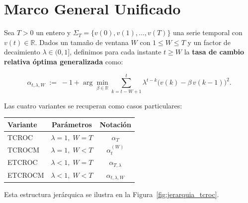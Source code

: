 \section{Marco General Unificado}
\label{sec:tcroc_marco_general}

Sea \(T > 0\) un entero y \(\Sigma_T = \{v(0), v(1), \dots, v(T)\}\) una serie temporal con \(v(t) \in \mathbb{R}\). Dados un tamaño de ventana \(W\) con \(1 \leq W \leq T\) y un factor de decaimiento \(\lambda \in (0, 1]\), definimos para cada instante \(t \geq W\) la \textbf{tasa de cambio relativa óptima generalizada} como:

\begin{equation}
    \alpha_{t,\lambda,W} \;:=\; -1 + \arg\min_{\beta \in \mathbb{R}} \sum_{k=t-W+1}^{t} \lambda^{t-k} \bigl(v(k) - \beta\, v(k-1)\bigr)^2.
\label{eq:tcroc_general}
\end{equation}

Las cuatro variantes se recuperan como casos particulares:

\begin{center}
\renewcommand{\arraystretch}{1.3}
\begin{tabular}{lcc}
\toprule
\textbf{Variante} & \textbf{Parámetros} & \textbf{Notación} \\
\midrule
TCROC   & \(\lambda = 1,\; W = T\) & \(\alpha_T\) \\
TCROCM  & \(\lambda = 1,\; W < T\) & \(\alpha_{t}^{(W)}\) \\
ETCROC  & \(\lambda < 1,\; W = T\) & \(\alpha_{T,\lambda}\) \\
ETCROCM & \(\lambda < 1,\; W < T\) & \(\alpha_{t,\lambda,W}\) \\
\bottomrule
\end{tabular}
\end{center}

Esta estructura jerárquica se ilustra en la Figura~\ref{fig:jerarquia_tcroc}.

